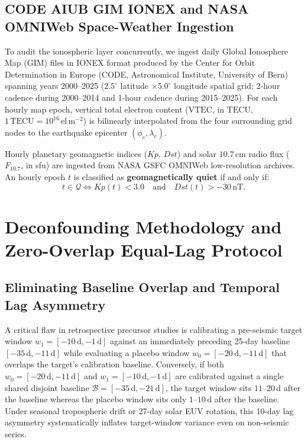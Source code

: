 ﻿\documentclass[journal]{IEEEtran}
\begin{document}
\subsection{CODE AIUB GIM IONEX and NASA OMNIWeb Space-Weather Ingestion}
To audit the ionospheric layer concurrently, we ingest \LgIonexMapsIngested{} daily Global Ionosphere Map (GIM) files in IONEX format produced by the Center for Orbit Determination in Europe (CODE, Astronomical Institute, University of Bern) \cite{schaer1999} spanning years 2000--2025 ($2.5^\circ$ latitude $\times 5.0^\circ$ longitude spatial grid; 2-hour cadence during 2000--2014 and 1-hour cadence during 2015--2025). For each hourly map epoch, vertical total electron content ($\text{VTEC}$, in $\text{TECU}$, $1\,\text{TECU} = 10^{16}\,\text{el}\,\text{m}^{-2}$) is bilinearly interpolated from the four surrounding grid nodes to the earthquake epicenter $(\phi_e, \lambda_e)$.

Hourly planetary geomagnetic indices ($Kp$, $Dst$) and solar $10.7$\,cm radio flux ($F_{10.7}$, in sfu) are ingested from NASA GSFC OMNIWeb low-resolution archives. An hourly epoch $t$ is classified as \textbf{geomagnetically quiet} if and only if:
\begin{equation}
    t \in \mathcal{Q} \iff Kp(t) < 3.0 \quad \text{and} \quad Dst(t) > -30\,\text{nT}.
    \label{eq:quiet_mask}
\end{equation}

\section{Deconfounding Methodology and Zero-Overlap Equal-Lag Protocol}

\subsection{Eliminating Baseline Overlap and Temporal Lag Asymmetry}
A critical flaw in retrospective precursor studies is calibrating a pre-seismic target window $w_1 = [-10\,\text{d}, -1\,\text{d}]$ against an immediately preceding 25-day baseline $[-35\,\text{d}, -11\,\text{d}]$ while evaluating a placebo window $w_0 = [-20\,\text{d}, -11\,\text{d}]$ that overlaps the target's calibration baseline. Conversely, if both $w_0 = [-20\,\text{d}, -11\,\text{d}]$ and $w_1 = [-10\,\text{d}, -1\,\text{d}]$ are calibrated against a single shared disjoint baseline $\mathcal{B} = [-35\,\text{d}, -21\,\text{d}]$, the target window sits $11\text{--}20\,\text{d}$ after the baseline whereas the placebo window sits only $1\text{--}10\,\text{d}$ after the baseline. Under seasonal tropospheric drift or 27-day solar EUV rotation, this 10-day lag asymmetry systematically inflates target-window variance even on non-seismic series.
\end{document}
